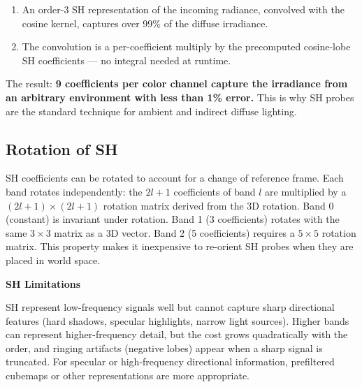 \documentclass[
  11pt,
  letterpaper,
  DIV=11,
  numbers=noendperiod,
  twoside,
  open=right]{scrreprt}
\providecommand{\tightlist}{%
  \setlength{\itemsep}{0pt}\setlength{\parskip}{0pt}}
\begin{document}
\begin{enumerate}
\def\labelenumi{\arabic{enumi}.}
\tightlist
\item
  An order-3 SH representation of the incoming radiance, convolved with
  the cosine kernel, captures over 99\% of the diffuse irradiance.
\item
  The convolution is a per-coefficient multiply by the precomputed
  cosine-lobe SH coefficients --- no integral needed at runtime.
\end{enumerate}

The result: \textbf{9 coefficients per color channel capture the
irradiance from an arbitrary environment with less than 1\% error.} This
is why SH probes are the standard technique for ambient and indirect
diffuse lighting.

\subsection{Rotation of SH}\label{rotation-of-sh}

SH coefficients can be rotated to account for a change of reference
frame. Each band rotates independently: the \(2l + 1\) coefficients of
band \(l\) are multiplied by a \((2l+1) \times (2l+1)\) rotation matrix
derived from the 3D rotation. Band 0 (constant) is invariant under
rotation. Band 1 (3 coefficients) rotates with the same \(3 \times 3\)
matrix as a 3D vector. Band 2 (5 coefficients) requires a \(5 \times 5\)
rotation matrix. This property makes it inexpensive to re-orient SH
probes when they are placed in world space.

\begin{tcolorbox}[enhanced jigsaw, arc=.35mm, bottomrule=.15mm, breakable, colback=white, colframe=quarto-callout-note-color-frame, left=2mm, leftrule=.75mm, opacityback=0, rightrule=.15mm, toprule=.15mm]
\begin{minipage}[t]{5.5mm}
\textcolor{quarto-callout-note-color}{\faInfo}
\end{minipage}%
\begin{minipage}[t]{\textwidth - 5.5mm}

\vspace{-3mm}\textbf{SH Limitations}\vspace{3mm}

SH represent low-frequency signals well but cannot capture sharp
directional features (hard shadows, specular highlights, narrow light
sources). Higher bands can represent higher-frequency detail, but the
cost grows quadratically with the order, and ringing artifacts (negative
lobes) appear when a sharp signal is truncated. For specular or
high-frequency directional information, prefiltered cubemaps or other
representations are more appropriate.

\end{minipage}%
\end{tcolorbox}
\end{document}

